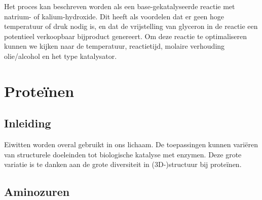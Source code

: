 \documentclass[a4paper,kul]{kulakarticle} %
\begin{document}
Het proces kan beschreven worden als een base-gekatalyseerde reactie met natrium- of kalium-hydroxide. Dit heeft als voordelen dat er geen hoge temperatuur of druk nodig is, en dat de vrijstelling van glyceron in de reactie een potentieel verkoopbaar bijproduct genereert. Om deze reactie te optimaliseren kunnen we kijken naar de temperatuur, reactietijd, molaire verhouding olie/alcohol en het type katalysator.
\newpage
\section{Proteïnen}
\subsection{Inleiding}
Eiwitten worden overal gebruikt in ons lichaam. De toepassingen kunnen variëren van structurele doeleinden tot biologische katalyse met enzymen. Deze grote variatie is te danken aan de grote diversiteit in (3D-)structuur bij proteïnen. 
\subsection{Aminozuren}
\end{document}

